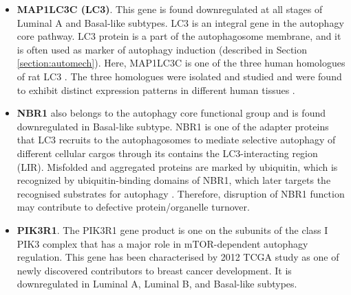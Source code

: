 \begin{itemize}

    \item \textbf{MAP1LC3C (LC3)}. This gene is found downregulated at all stages of Luminal A and Basal-like subtypes. LC3 is an integral gene in the autophagy core pathway. LC3 protein is a part of the autophagosome membrane, and it is often used as marker of autophagy induction (described in Section \ref{section:automech}). Here, MAP1LC3C is one of the three human homologues of rat LC3 \cite{he2003post}. The three homologues were isolated and studied and were found to exhibit distinct expression patterns in different human tissues \cite{he2003post}.
    

    

\item \textbf{NBR1} also belongs to the autophagy core functional group and is found downregulated in Basal-like subtype. NBR1 is one of the adapter proteins that LC3 recruits to the autophagosomes to mediate selective autophagy of different cellular cargos through its contains the LC3-interacting region (LIR). Misfolded and aggregated proteins are marked by ubiquitin, which is recognized by ubiquitin-binding domains of NBR1, which later targets the recognised substrates for autophagy \cite{DebnathTheCancer}. Therefore, disruption of NBR1 function may contribute to defective protein/organelle turnover.



\item \textbf{PIK3R1}. The PIK3R1 gene product is one on the subunits of the class I PIK3 complex that has a major role in mTOR-dependent autophagy regulation. This gene has been characterised by 2012 TCGA study \cite{TCGAResearchNetwork2012} as one of newly discovered contributors to breast cancer development. It is downregulated in Luminal A, Luminal B, and Basal-like subtypes.










\end{itemize}


